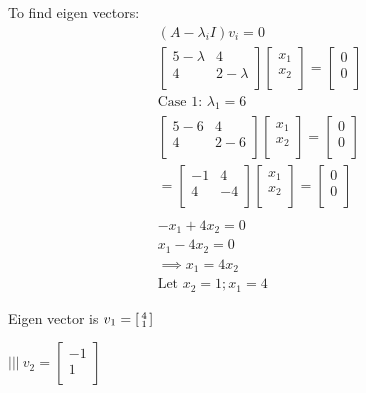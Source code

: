 \documentclass[english,course,fleqn]{lecture}
\newenvironment{qanda}{\begin{enumerate}\setlength{\parindent}{0pt}}{\medskip\end{enumerate}}
\begin{document}
\begin{qanda}
    To find eigen vectors:
    \begin{gather*}
      (A - \lambda_{i}I)v_{i} = 0\\
      \begin{bmatrix}
        5 - \lambda & 4 \\
        4 & 2 - \lambda \\
        \end{bmatrix} \begin{bmatrix}
        x_{1} \\
        x_{2} \\
        \end{bmatrix} = \begin{bmatrix}
        0 \\
        0 \\
      \end{bmatrix}\\
      \text{Case 1: } \lambda_{1} = 6\\
      \begin{bmatrix}
        5 - 6 & 4 \\
        4 & 2 - 6 \\
        \end{bmatrix} \begin{bmatrix}
        x_{1} \\
        x_{2} \\
        \end{bmatrix} = \begin{bmatrix}
        0 \\
        0 \\
      \end{bmatrix}\\
      = \begin{bmatrix}
        -1 & 4 \\
        4 & -4 \\
        \end{bmatrix} \begin{bmatrix}
        x_{1} \\
        x_{2} \\
        \end{bmatrix} = \begin{bmatrix}
        0 \\
        0 \\
      \end{bmatrix}\\
      \\
      -x_{1} + 4 x_{2} = 0\\
      x_{1} - 4 x_{2} = 0\\
      \implies x_{1} = 4 x_{2}\\
      \text{Let } x_{2} = 1; x_{1} = 4
    \end{gather*}

    Eigen vector is $v_{1} = \begin{bsmallmatrix}
      4 \\
      1 \\
    \end{bsmallmatrix}$

    $||| ~ v_{2} = \begin{bmatrix}
      -1 \\
      1 \\
    \end{bmatrix}$
  \end{qanda}

  
\end{document}

